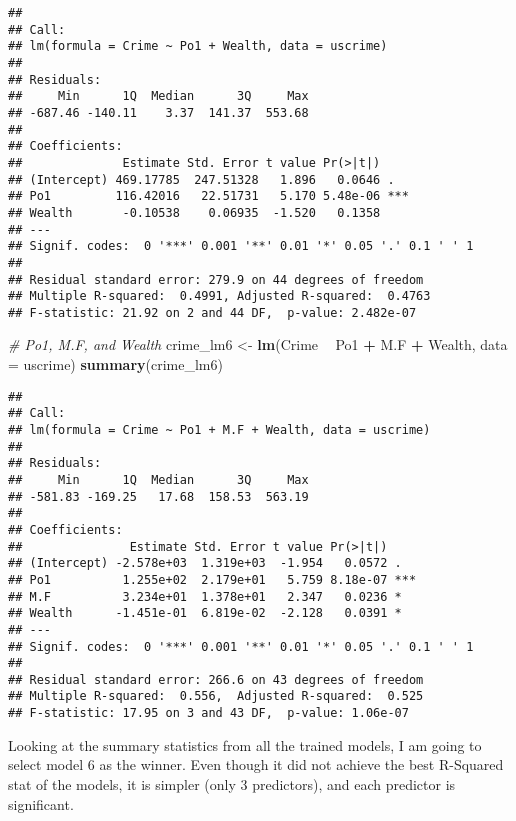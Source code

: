 \documentclass[]{article}
\newenvironment{Shaded}{\begin{snugshade}}{\end{snugshade}}
\newcommand{\KeywordTok}[1]{\textcolor[rgb]{0.13,0.29,0.53}{\textbf{#1}}}
\newcommand{\DataTypeTok}[1]{\textcolor[rgb]{0.13,0.29,0.53}{#1}}
\newcommand{\StringTok}[1]{\textcolor[rgb]{0.31,0.60,0.02}{#1}}
\newcommand{\CommentTok}[1]{\textcolor[rgb]{0.56,0.35,0.01}{\textit{#1}}}
\newcommand{\OperatorTok}[1]{\textcolor[rgb]{0.81,0.36,0.00}{\textbf{#1}}}
\newcommand{\NormalTok}[1]{#1}
\begin{document}
\begin{verbatim}
## 
## Call:
## lm(formula = Crime ~ Po1 + Wealth, data = uscrime)
## 
## Residuals:
##     Min      1Q  Median      3Q     Max 
## -687.46 -140.11    3.37  141.37  553.68 
## 
## Coefficients:
##              Estimate Std. Error t value Pr(>|t|)    
## (Intercept) 469.17785  247.51328   1.896   0.0646 .  
## Po1         116.42016   22.51731   5.170 5.48e-06 ***
## Wealth       -0.10538    0.06935  -1.520   0.1358    
## ---
## Signif. codes:  0 '***' 0.001 '**' 0.01 '*' 0.05 '.' 0.1 ' ' 1
## 
## Residual standard error: 279.9 on 44 degrees of freedom
## Multiple R-squared:  0.4991, Adjusted R-squared:  0.4763 
## F-statistic: 21.92 on 2 and 44 DF,  p-value: 2.482e-07
\end{verbatim}

\begin{Shaded}
\begin{Highlighting}[]
\CommentTok{# Po1, M.F, and Wealth}
\NormalTok{crime_lm6 <-}\StringTok{ }\KeywordTok{lm}\NormalTok{(Crime }\OperatorTok{~}\StringTok{ }\NormalTok{Po1 }\OperatorTok{+}\StringTok{ }\NormalTok{M.F }\OperatorTok{+}\StringTok{ }\NormalTok{Wealth, }\DataTypeTok{data =}\NormalTok{ uscrime)}
\KeywordTok{summary}\NormalTok{(crime_lm6)}
\end{Highlighting}
\end{Shaded}

\begin{verbatim}
## 
## Call:
## lm(formula = Crime ~ Po1 + M.F + Wealth, data = uscrime)
## 
## Residuals:
##     Min      1Q  Median      3Q     Max 
## -581.83 -169.25   17.68  158.53  563.19 
## 
## Coefficients:
##               Estimate Std. Error t value Pr(>|t|)    
## (Intercept) -2.578e+03  1.319e+03  -1.954   0.0572 .  
## Po1          1.255e+02  2.179e+01   5.759 8.18e-07 ***
## M.F          3.234e+01  1.378e+01   2.347   0.0236 *  
## Wealth      -1.451e-01  6.819e-02  -2.128   0.0391 *  
## ---
## Signif. codes:  0 '***' 0.001 '**' 0.01 '*' 0.05 '.' 0.1 ' ' 1
## 
## Residual standard error: 266.6 on 43 degrees of freedom
## Multiple R-squared:  0.556,  Adjusted R-squared:  0.525 
## F-statistic: 17.95 on 3 and 43 DF,  p-value: 1.06e-07
\end{verbatim}

Looking at the summary statistics from all the trained models, I am
going to select model 6 as the winner. Even though it did not achieve
the best R-Squared stat of the models, it is simpler (only 3
predictors), and each predictor is significant.
\end{document}
